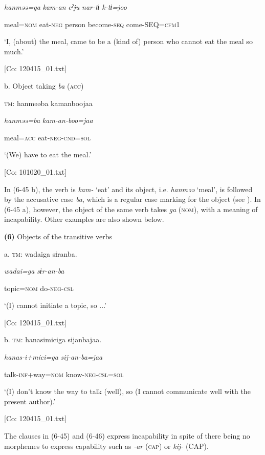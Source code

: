       \textit{hanməə=ga}  \textit{kam-an}  \textit{cˀju}  \textit{nar-tɨ}  \textit{k-tɨ=joo}

      meal=\textsc{nom}  eat-\textsc{neg}  person  become-\textsc{seq}  come-SEQ=\textsc{cfm}1

      ‘I, (about) the meal, came to be a (kind of) person who cannot eat the meal so much.’

      [Co: 120415\_01.txt]

  b.  Object taking \textit{ba} (\textsc{acc})

    \textsc{tm}:  hanməəba  kamanboojaa

      \textit{hanməə=ba}  \textit{kam-an-boo=jaa}

      meal=\textsc{acc}  eat-\textsc{neg}-\textsc{cnd}=\textsc{sol}

      ‘(We) have to eat the meal.’

      [Co: 101020\_01.txt]

In (6-45 b), the verb is \textit{kam-} ‘eat’ and its object, i.e. \textit{hanməə} ‘meal’, is followed by the accusative case \textit{ba}, which is a regular case marking for the object (see ). In (6-45 a), however, the object of the same verb takes \textit{ga} (\textsc{nom}), with a meaning of incapability. Other examples are also shown below.

\textbf{(6)}  Objects of the transitive verbs

  a.  \textsc{tm}:  {\textbar}wadai{\textbar}ga  sɨranba.

      \textit{wadai=ga}  \textit{sɨr-an-ba}

      topic=\textsc{nom}  do-\textsc{neg}-\textsc{csl}

      ‘(I) cannot initiate a topic, so ...’

      [Co: 120415\_01.txt]

  b.  \textsc{tm}:  hanasimiciga  sijanbajaa.

      \textit{hanas-i+mici=ga}  \textit{sij-an-ba=jaa}

      talk-\textsc{inf}+way=\textsc{nom}  know-\textsc{neg}-\textsc{csl}=\textsc{sol}

      ‘(I) don’t know the way to talk (well), so (I cannot communicate well with the present author).’

      [Co: 120415\_01.txt]

The clauses in (6-45) and (6-46) express incapability in spite of there being no morphemes to express capability such as \textit{{}-ar} (\textsc{cap}) or \textit{kij-} (CAP).

